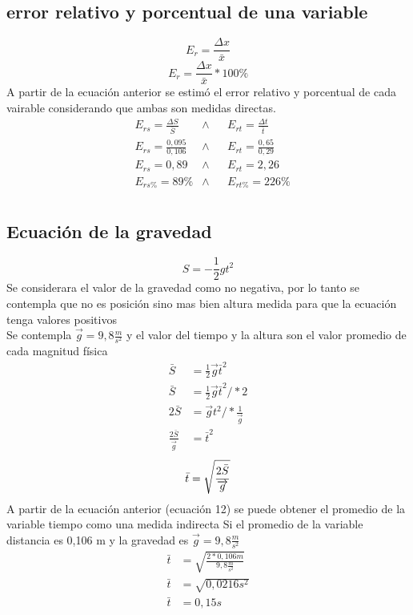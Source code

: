 \documentclass[runningheads]{llncs}
\begin{document}
\subsection{error relativo y porcentual de una variable}
    \begin{equation}
        E_{r}=\frac{\Delta x}{\bar{x}}
    \end{equation}
    \begin{equation}
        E_{r}=\frac{\Delta x}{\bar{x}}*100\%
    \end{equation}
    A partir de la ecuación anterior se estimó el error relativo y porcentual de cada vairable considerando que ambas son medidas directas. 
    \begin{align*}
        &E_{rs}=\frac{\Delta S}{\bar{S}}
        &\wedge&
        &E_{rt}=\frac{\Delta t}{\bar{t}}\\
        &E_{rs}=\frac{0,095}{0,106}
        &\wedge&
        &E_{rt}=\frac{0,65}{0,29}\\
        &E_{rs}=0,89
        &\wedge&
        &E_{rt}=2,26 \tag{G}\\
        &E_{rs\%}=89\% 
        &\wedge&
        &E_{rt\%}=226\% \tag{H}\\
    \end{align*}
\subsection{Ecuación de la gravedad}
    \begin{equation}
        S =-\frac{1}{2}gt^{2}
    \end{equation}
    Se considerara el valor de la gravedad como no negativa, por lo tanto se contempla que no es posición sino mas bien altura medida para que la ecuación tenga valores positivos\\
    Se contempla $\vec{g}=9,8 \frac{m}{{s}^{2}}$ y el valor del tiempo y la altura son el valor promedio de cada magnitud física \\
    \begin{align*}
        \bar{S} & =\frac{1}{2}\overrightarrow{g}\bar{t}^{2}\\
        \bar{S} & =\frac{1}{2}\overrightarrow{g}\bar{t}^{2} / *2\\
        2\bar{S}& =\overrightarrow{g}t^{2}/ *\frac{1}{\overrightarrow{g}}\\  
        \frac{2\bar{S}}{\overrightarrow{g}} & =\bar{t}^{2}
    \end{align*}
    \begin{equation}
        \bar{t}=\sqrt{\frac{2\bar{S}}{\overrightarrow{g}}}\\
    \end{equation}    
    A partir de la ecuación anterior (ecuación 12) se puede obtener el promedio de la variable tiempo como una medida indirecta
    Si el promedio de la variable distancia es 0,106 m y la gravedad es $\overrightarrow{g}=9,8 \frac{m}{s^{2}}$
    \begin{align*}
        \bar{t}&=\sqrt{\frac{2*0,106 m}{9,8\frac{m}{s^{2}}}}\\
        \bar{t}&=\sqrt{0,0216 s^{2}}\\
        \bar{t}&=0,15 s\tag{I}\\
    \end{align*}
\end{document}
